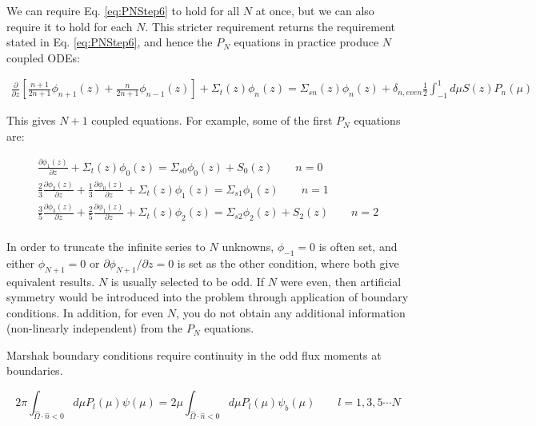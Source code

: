 \documentclass[10pt]{article}
\newcommand{\hO}{\hat{\Omega}}
\newcounter{subsubsubsection}[subsubsection]
\begin{document}
\begin{flushleft}
We can require Eq. \eqref{eq:PNStep6} to hold for all \(N\) at once, but we can also require it to hold for each \(N\). This stricter requirement returns the requirement stated in Eq. \eqref{eq:PNStep6}, and hence the \(P_N\) equations in practice produce \(N\) coupled ODEs:

\begin{equation}
\label{eq:PNEquations}
\begin{aligned}
\frac{\partial}{\partial z}\left\lbrack\frac{n+1}{2n+1}\phi_{n+1}(z) +\frac{n}{2n+1} \phi_{n-1}(z)\right\rbrack + \Sigma_t(z)\phi_n(z) =
\Sigma_{sn}(z)\phi_n(z) +  \delta_{n,even}\frac{1}{2}\int_{-1}^{1}d\mu S(z)P_n(\mu)
 \end{aligned}
 \end{equation}

This gives \(N+1\) coupled equations. For example, some of the first \(P_N\) equations are:
 
 \begin{equation}
 \begin{aligned}
\frac{\partial\phi_{1}(z)}{\partial z} + \Sigma_t(z)\phi_0(z)=\Sigma_{s0}\phi_0(z)+ S_0(z)\quad\quad n=0\\
\frac{2}{3}\frac{\partial\phi_{2}(z)}{\partial z}+\frac{1}{3}\frac{\partial\phi_{0}(z)}{\partial z} + \Sigma_t(z)\phi_1(z)=\Sigma_{s1}\phi_1(z)\quad\quad n=1\\
\frac{3}{5}\frac{\partial\phi_{3}(z)}{\partial z}+\frac{2}{5}\frac{\partial\phi_{1}(z)}{\partial z} + \Sigma_t(z)\phi_2(z)=\Sigma_{s2}\phi_2(z)+ S_2(z)\quad\quad n=2\\
\end{aligned}
\end{equation}

In order to truncate the infinite series to \(N\) unknowns, \(\phi_{-1}=0\) is often set, and either \(\phi_{N+1}=0\) or \(\partial\phi_{N+1}/\partial z=0\) is set as the other condition, where both give equivalent results. \(N\) is usually selected to be odd. If \(N\) were even, then artificial symmetry would be introduced into the problem through application of boundary conditions. In addition, for even \(N\), you do not obtain any additional information (non-linearly independent) from the \(P_N\) equations. 

Marshak boundary conditions require continuity in the odd flux moments at boundaries. 

\begin{equation}
2\pi\int_{\hO  \cdot\hat{n}<0}^{}d\mu P_l(\mu)\psi(\mu)=2\mu\int_{\hO  \cdot\hat{n}<0}^{}d\mu P_l(\mu)\psi_b(\mu)\quad\quad l=1, 3, 5\cdots N
\end{equation}


\end{flushleft}
\end{document}
